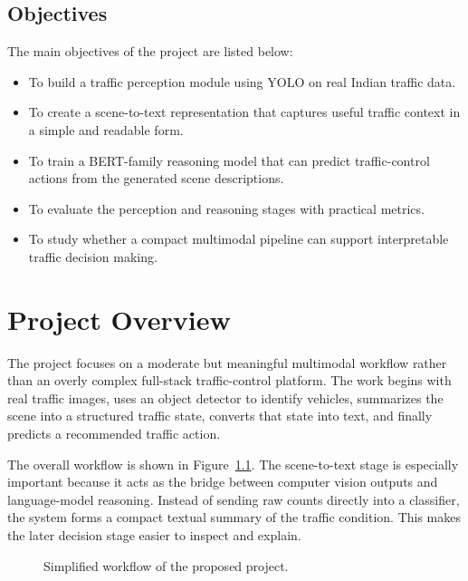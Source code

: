 \documentclass[12pt,a4paper]{report}
\begin{document}
\section*{Objectives}
The main objectives of the project are listed below:
\begin{itemize}[leftmargin=1.5cm]
\item To build a traffic perception module using YOLO on real Indian traffic data.
\item To create a scene-to-text representation that captures useful traffic context in a simple and readable form.
\item To train a BERT-family reasoning model that can predict traffic-control actions from the generated scene descriptions.
\item To evaluate the perception and reasoning stages with practical metrics.
\item To study whether a compact multimodal pipeline can support interpretable traffic decision making.
\end{itemize}

\chapter{Project Overview}
The project focuses on a moderate but meaningful multimodal workflow rather than an overly complex full-stack traffic-control platform. The work begins with real traffic images, uses an object detector to identify vehicles, summarizes the scene into a structured traffic state, converts that state into text, and finally predicts a recommended traffic action.

The overall workflow is shown in Figure~\ref{fig:pipeline}. The scene-to-text stage is especially important because it acts as the bridge between computer vision outputs and language-model reasoning. Instead of sending raw counts directly into a classifier, the system forms a compact textual summary of the traffic condition. This makes the later decision stage easier to inspect and explain.

\begin{figure}[H]
\centering
{}
\caption{Simplified workflow of the proposed project.}
\label{fig:pipeline}
\end{figure}
\end{document}
